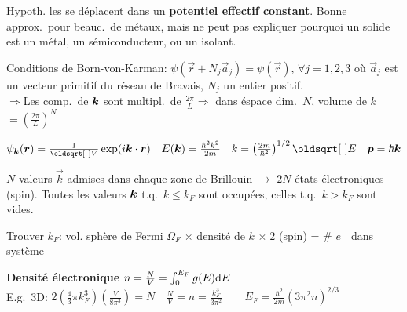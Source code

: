 Hypoth.\: les \elec se déplacent dans un \textbf{potentiel eﬀectif constant}. Bonne approx.\ pour beauc.\ de métaux, mais ne peut pas expliquer pourquoi un solide est un métal, un sémiconducteur, ou un isolant.
\begin{squishlist}
    \item Conditions de Born-von-Karman: $\psi(\vec{r} + N_j \vec{a}_j) = \psi(\vec{r}), \, \forall j=1,2,3$ où $\vec{a}_j$ est un vecteur primitif du réseau de Bravais, $N_j$ un entier positif. \\
    $\Rightarrow$Les comp.\ de $\bm{k}$ sont multipl.\ de $\frac{2\pi}{L} \Longrightarrow$ dans éspace dim.\ $N$, volume de $k$ $=\left(\frac{2\pi}{L}\right)^N$
    \item $\psi_{\vk}(\vr) = \frac{1}{\sqrt{V}}\exp(i \vk \cdot \vr) \quad E(\vk) = \frac{\hbar^2 k^2}{2m} \quad k = \left(\frac{2m}{\hbar^2}\right)^{1/2} \sqrt{E} \quad \vec{p}=\hbar \vec{k}$
    \item $N$ valeurs $\vec{k}$ admises dans chaque zone de Brillouin $\rightarrow$ $2N$ états électroniques (spin). Toutes les valeurs $\bm{k}$ t.q.\ $k\leq k_F$ sont occupées, celles t.q.\ $k > k_F$ sont vides.
    \item Trouver $k_F$: vol. sphère de Fermi $\Omega_F$ $\times$ densité de $k$ $\times \; 2$ (spin) = \# $e^-$ dans système 
    \item \textbf{Densité électronique} $n = \frac{N}{V} = \int_0^{E_F} g(E) \textrm{d} E$ \\
    E.g.\ 3D: $2 \left( \frac{4}{3}\pi k^3_F\right) \left( \frac{V}{8\pi^3}\right) = N \quad \frac{N}{V} = n = \frac{k_F^3}{3\pi^2} \qquad E_F = \frac{\hbar^2}{2m}(3\pi^2 n)^{2/3}$


\end{squishlist}
